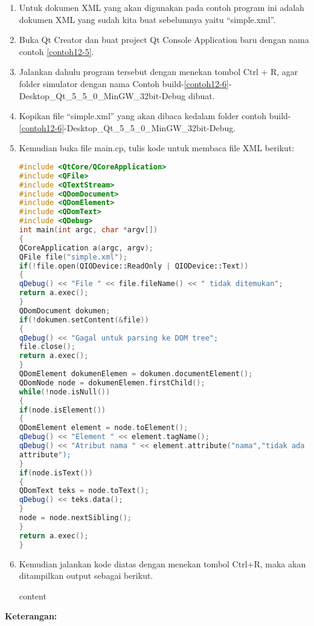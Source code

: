 \begin{enumerate}

\item
  Untuk dokumen XML yang akan digunakan pada contoh program ini adalah
  dokumen XML yang sudah kita buat sebelumnya yaitu ``simple.xml''.
\item
  Buka Qt Creator dan buat project Qt Console Application baru dengan
  nama contoh \ref{contoh12-5}.
\item
  Jalankan dahulu program tersebut dengan menekan tombol Ctrl + R, agar
  folder simulator dengan nama Contoh build-\ref{contoh12-6}-Desktop\_Qt\_5\_5\_0\_MinGW\_32bit-Debug dibuat.
\item
  Kopikan file ``simple.xml'' yang akan dibaca kedalam folder contoh
  build-\ref{contoh12-6}-Desktop\_Qt\_5\_5\_0\_MinGW\_32bit-Debug.
\item
  Kemudian buka file main.cp, tulis kode untuk membaca file XML berikut:

\begin{lstlisting}[language=c++, caption=Contoh Membaca DOM dari dokumen XML, label=contoh12-6]
#include <QtCore/QCoreApplication>
#include <QFile>
#include <QTextStream>
#include <QDomDocument>
#include <QDomElement>
#include <QDomText>
#include <QDebug>
int main(int argc, char *argv[])
{
QCoreApplication a(argc, argv);
QFile file("simple.xml");
if(!file.open(QIODevice::ReadOnly | QIODevice::Text))
{
qDebug() << "File " << file.fileName() << " tidak ditemukan";
return a.exec();
}
QDomDocument dokumen;
if(!dokumen.setContent(&file))
{
qDebug() << "Gagal untuk parsing ke DOM tree";
file.close();
return a.exec();
}
QDomElement dokumenElemen = dokumen.documentElement();
QDomNode node = dokumenElemen.firstChild();
while(!node.isNull())
{
if(node.isElement())
{
QDomElement element = node.toElement();
qDebug() << "Element " << element.tagName();
qDebug() << "Atribut nama " << element.attribute("nama","tidak ada
attribute");
}
if(node.isText())
{
QDomText teks = node.toText();
qDebug() << teks.data();
}
node = node.nextSibling();
}
return a.exec();
}
\end{lstlisting}
\item
  Kemudian jalankan kode diatas dengan menekan tombol Ctrl+R, maka akan
  ditampilkan output sebagai berikut.
  
  \begin{lcverbatim}
  	content
  \end{lcverbatim}
\end{enumerate}

\textbf{Keterangan:}


